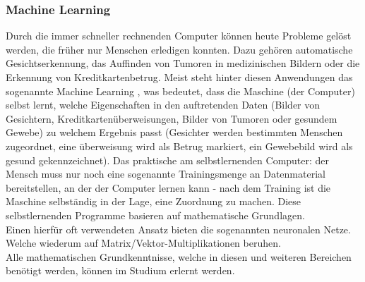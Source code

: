 \subsubsection{Machine Learning}
Durch die immer schneller rechnenden Computer können heute Probleme gelöst werden, die früher nur Menschen erledigen konnten. Dazu gehören automatische Gesichtserkennung, das Auffinden von Tumoren in medizinischen Bildern oder die Erkennung von Kreditkartenbetrug. Meist steht hinter diesen Anwendungen das sogenannte \glqq Machine Learning \grqq, was bedeutet, dass die Maschine (der Computer) selbst lernt, welche Eigenschaften in den auftretenden Daten (Bilder von Gesichtern, Kreditkartenüberweisungen, Bilder von Tumoren oder gesundem Gewebe) zu welchem Ergebnis passt (Gesichter werden bestimmten Menschen zugeordnet, eine überweisung wird als Betrug markiert, ein Gewebebild wird als gesund gekennzeichnet). Das praktische am selbstlernenden Computer: der Mensch muss nur noch eine sogenannte Trainingsmenge an Datenmaterial bereitstellen, an der der Computer lernen kann - nach dem Training ist die Maschine selbständig in der Lage, eine Zuordnung zu machen.
Diese selbstlernenden Programme basieren auf mathematische Grundlagen.\\
Einen hierfür oft verwendeten Ansatz bieten die sogenannten \glqq neuronalen Netze\grqq.
Welche wiederum auf  Ma\-trix/\-Vektor-\-Multiplikationen beruhen.\vspace{0.5cm}\\
Alle mathematischen Grundkenntnisse, welche in diesen und weiteren Bereichen benötigt werden, können im Studium erlernt werden.